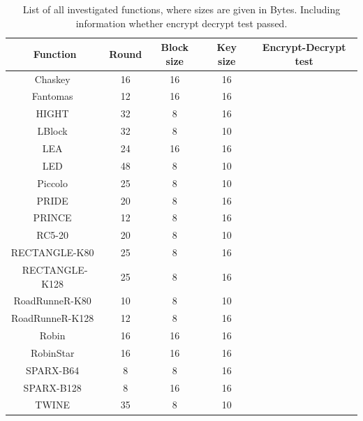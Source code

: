 \documentclass[
    digital,    %
    oneside,    %
    color,
    11pt,
    nocover,
    notable,
    nolof,
    nolot,
    final
]{fithesis3}
\renewcommand\_{\textunderscore\allowbreak}
\newcommand{\cmark}{\ding{51}}%
\newcommand{\xmark}{\ding{55}}%
\begin{document}
\begin{table}[t]
	\centering
	\begin{tabular}{c|c c c c}
		\textbf{\large Function} & \textbf{\large Round} & \textbf{\large Block size} & \textbf{\large Key size} & \textbf{\large Encrypt-Decrypt test}\\ \hline
		Chaskey~\cite{cryptoeprint:2014:386}				& 16	& 16	& 16	& \cmark	\\ \hline
		Fantomas~\cite{grosso2014ls}						& 12	& 16	& 16	& \cmark 	\\ \hline
		HIGHT~\cite{10.1007/11894063_4}						& 32	& 8		& 16	& \xmark 	\\ \hline
		LBlock~\cite{10.1007/978-3-642-21554-4_19}			& 32	& 8		& 10	& \xmark \\ \hline
		LEA~\cite{Hong2013LEAA1}							& 24	& 16	& 16	& \xmark \\ \hline
		LED~\cite{Guo:2011:LBC:2044928.2044958}				& 48	& 8		& 10	& \cmark \\ \hline
		Piccolo~\cite{10.1007/978-3-642-23951-9_23}			& 25	& 8		& 10	& \cmark \\ \hline
		PRIDE~\cite{10.1007/978-3-662-44371-2_4}			& 20	& 8		& 16	& \xmark  \\ \hline
		PRINCE~\cite{10.1007/978-3-642-34961-4_14}			& 12	& 8		& 16	& \cmark \\ \hline
		RC5-20~\cite{10.1007/3-540-60590-8_7}				& 20	& 8		& 10	& \cmark \\ \hline
		RECTANGLE-K80~\cite{Zhang2015}						& 25	& 8		& 16	& \xmark \\ \hline
		RECTANGLE-K128~\cite{Zhang2015}						& 25	& 8		& 16	& \xmark \\ \hline
		RoadRunneR-K80~\cite{10.1007/978-3-319-29078-2_4}	& 10	& 8		& 10	& \cmark \\ \hline
		RoadRunneR-K128~\cite{10.1007/978-3-319-29078-2_4}	& 12	& 8		& 16	& \cmark \\ \hline
		Robin~\cite{grosso2014ls}							& 16	& 16	& 16	& \cmark \\ \hline
		RobinStar~\cite{grosso2014ls}						& 16	& 16	& 16	& \cmark \\ \hline
		SPARX-B64~\cite{10.1007/978-3-662-53887-6_18}		& 8		& 8		& 16	& \cmark \\ \hline
		SPARX-B128~\cite{10.1007/978-3-662-53887-6_18}		& 8		& 16	& 16	& \cmark \\ \hline
		TWINE~\cite{twine}									& 35	& 8		& 10	& \cmark \\ \hline
		
		
	\end{tabular}
	\caption{List of all investigated functions, where sizes are given in Bytes. Including information whether encrypt decrypt test passed.}
	\label{table:list-of-investigated functions}
\end{table}
\end{document}
